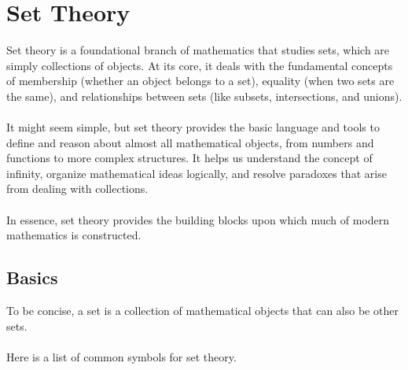 \section{Set Theory}
Set theory is a foundational branch of mathematics that studies sets, which are simply collections of objects. At its core, it deals with the fundamental concepts of membership (whether an object belongs to a set), equality (when two sets are the same), and relationships between sets (like subsets, intersections, and unions).\\\\
It might seem simple, but set theory provides the basic language and tools to define and reason about almost all mathematical objects, from numbers and functions to more complex structures. It helps us understand the concept of infinity, organize mathematical ideas logically, and resolve paradoxes that arise from dealing with collections.\\\\
In essence, set theory provides the building blocks upon which much of modern mathematics is constructed.


\subsection{Basics}
\smallskip
To be concise, a set is a collection of mathematical objects that can also be other sets.\\\\
Here is a list of common symbols for set theory.

